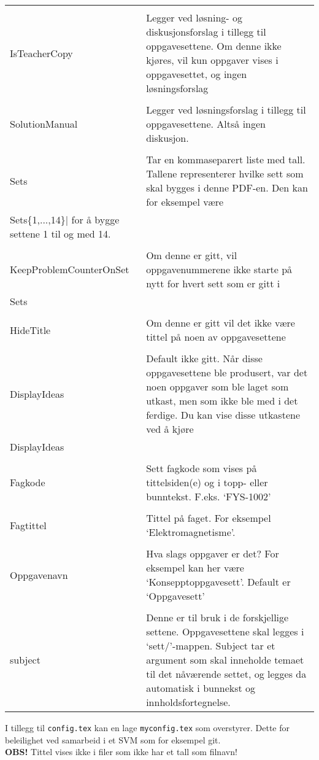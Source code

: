 \documentclass{article}
\begin{document}
\begin{tabularx}{\textwidth}{lX}
	\lstinline{\\IsTeacherCopy}&
	Legger ved løsning- og diskusjonsforslag i tillegg til oppgavesettene. Om denne ikke kjøres, vil kun oppgaver vises i oppgavesettet, og ingen løsningsforslag\\
	\lstinline{\\SolutionManual}&Legger ved løsningsforslag i tillegg til oppgavesettene. Altså ingen diskusjon.\\
	\lstinline{\\Sets}&Tar en kommaseparert liste med tall. Tallene representerer hvilke sett som skal bygges i denne PDF-en. Den kan for eksempel være \lstinline|\\Sets\{1,...,14\}| for å bygge settene 1 til og med 14.\\
	\lstinline{\\KeepProblemCounterOnSet}&Om denne er gitt, vil oppgavenummerene ikke starte på nytt for hvert sett som er gitt i \lstinline{\\Sets}. \\
	\lstinline{\\HideTitle}&Om denne er gitt vil det ikke være tittel på noen av oppgavesettene\\
	\lstinline{\\DisplayIdeas}&Default ikke gitt. Når disse oppgavesettene ble produsert, var det noen oppgaver som ble laget som utkast, men som ikke ble med i det ferdige. Du kan vise disse utkastene ved å kjøre \lstinline{\\DisplayIdeas} i config.tex.\\
	\lstinline{\\Fagkode}&Sett fagkode som vises på tittelsiden(e) og i topp- eller bunntekst. F.eks. `FYS-1002'\\
	\lstinline{\\Fagtittel}&Tittel på faget. For eksempel `Elektromagnetisme'.\\
	\lstinline{\\Oppgavenavn}&Hva slags oppgaver er det? For eksempel kan her være `Konsepptoppgavesett'. Default er `Oppgavesett'\\
	\lstinline{\\subject}&Denne er til bruk i de forskjellige settene. Oppgavesettene skal legges i `sett/'-mappen.
												Subject tar et argument som skal inneholde temaet til det nåværende settet, og legges da automatisk i bunnekst og innholdsfortegnelse.
\end{tabularx}
I tillegg til \lstinline{config.tex} kan en lage \lstinline{myconfig.tex} som overstyrer. Dette for beleilighet ved samarbeid i et SVM som for eksempel git.\\
\textbf{OBS!} Tittel vises ikke i filer som ikke har et tall som filnavn!
\clearpage
\end{document}
